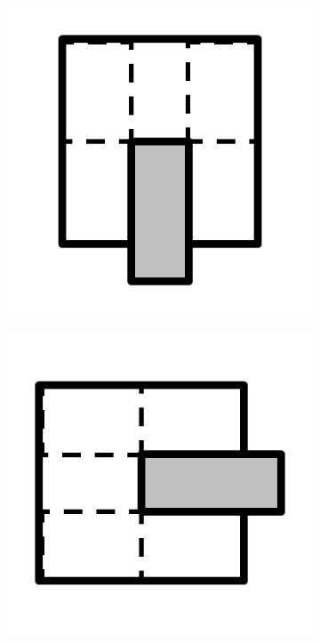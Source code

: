 \documentclass{article}
\begin{document}
\begin{figure}[!h]
  \centering
  \begin{subfigure}{.25\textwidth}
    \centering
    \includegraphics[width=.95\linewidth]{16cases/c1.png}
    \caption{}
    \label{fig:c1}
  \end{subfigure}%
  \begin{subfigure}{.25\textwidth}
    \centering
    \includegraphics[width=.95\linewidth]{16cases/c2.png}

\end{subfigure}
\end{figure}
\end{document}
